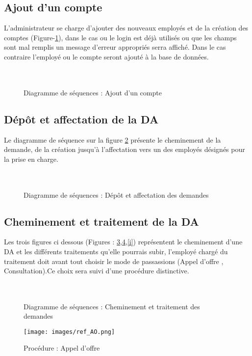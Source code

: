 \documentclass{report}
\begin{document}
\subsection{Ajout d'un compte}
L’administrateur se charge d’ajouter des nouveaux employés et de la création des comptes (Figure-\ref{e}), dans le cas ou le login est déjà utilisés ou que les champs sont mal remplis un message d’erreur appropriés serra affiché. Dans le cas contraire l’employé ou le compte seront ajouté à la base de données.\\\\\\
  \begin{figure}[h]
        \centering
        \caption{Diagramme de séquences : Ajout d'un compte}
        \label{e}
    \end{figure}


\newpage
\subsection{Dépôt et affectation de la DA}
Le diagramme de séquence sur la figure \ref{f} présente le cheminement de la demande, de la création jusqu’à l’affectation vers un des employés désignés pour la prise en charge.\\\\\\
  \begin{figure}[h]
        \centering
        \caption{Diagramme de séquences : Dépôt et affectation des demandes}
        \label{f}
    \end{figure}

\newpage
\subsection{Cheminement et traitement de la DA}
Les trois figures ci dessous (Figures : \ref{g},\ref{h},\ref{i}) représentent le cheminement d'une DA et les différents traitements qu'elle pourrais subir,
l'employé chargé du traitement doit avant tout choisir le mode de passassions (Appel d'offre , Consultation).Ce choix sera suivi d'une procédure distinctive.\\\\\\
  \begin{figure}[h]
        \centering
        \caption{Diagramme de séquences : Cheminement et traitement des demandes}
        \label{g}
    \end{figure}
    \newpage
     \begin{figure}[h]
        \centering
            \texttt{[image: images/ref\_AO.png]}
        \caption{Procédure : Appel d'offre}
        \label{h}
    \end{figure} 
\end{document}
